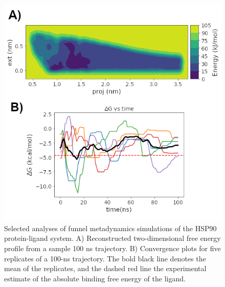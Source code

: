 \begin{figure}[htp]
\includegraphics[width=\linewidth]{LIVECOMS/02_funnel_metad/fun-hsp90-analyses.png}
\caption{Selected analyses of funnel metadynamics simulations of the HSP90 protein-ligand system. A) Reconstructed two-dimensional free energy profile from a sample 100 ns trajectory. B) Convergence plots for five replicates of a 100-ns trajectory. The bold black line denotes the mean of the replicates, and the dashed red line the experimental estimate of the absolute binding free energy of the ligand.}
\label{fig:fun-hsp90-analyses}
\end{figure}

